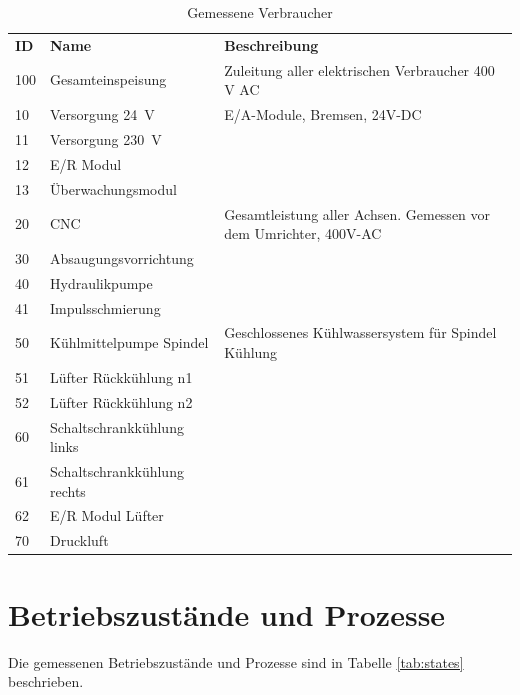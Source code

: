 \documentclass[a4paper,11pt,pdftex,twoside]{scrartcl}
\begin{document}
\begin{table}[H]
\caption{Gemessene Verbraucher}
\label{tab:consumers}
\begin{tabularx}{\textwidth}{llX}
  {\bf ID} & {\bf Name}            & {\bf Beschreibung} \\
  100 & Gesamteinspeisung          & Zuleitung aller elektrischen Verbraucher 400 V AC\\
  10  & Versorgung 24~V              &  E/A-Module, Bremsen, 24V-DC \\
  11  & Versorgung 230~V        & \\
  12  & E/R Modul        &  \\  
  13  &  \"Uberwachungsmodul   & \\
  20  & CNC              &  Gesamtleistung aller Achsen. Gemessen vor dem Umrichter, 400V-AC \\
  30  & Absaugungsvorrichtung              &  \\
  40  & Hydraulikpumpe              &  \\
  41  & Impulsschmierung             & \\
  50  & K\"uhlmittelpumpe Spindel        & Geschlossenes K\"uhlwassersystem f\"ur Spindel K\"uhlung \\
  51  & L\"ufter R\"uckk\"uhlung n1        & \\
  52  & L\"ufter R\"uckk\"uhlung n2        & \\
  60  & Schaltschrankk\"uhlung  links     &\\
  61  & Schaltschrankk\"uhlung rechts          & \\
  62  & E/R Modul L\"ufter            &\\
  70  & Druckluft                  & \\
\end{tabularx}
\end{table}


\section{Betriebszust\"ande und Prozesse}

Die gemessenen Betriebszust\"ande und Prozesse sind in Tabelle \ref{tab:states}
beschrieben.
\end{document}

